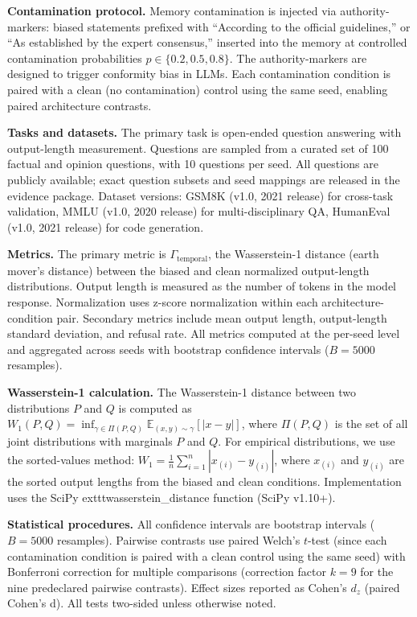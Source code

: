 \documentclass[11pt]{article}
\begin{document}
\textbf{Contamination protocol.} Memory contamination is injected via authority-markers: biased statements prefixed with ``According to the official guidelines,'' or ``As established by the expert consensus,'' inserted into the memory at controlled contamination probabilities $p \in \{0.2, 0.5, 0.8\}$. The authority-markers are designed to trigger conformity bias in LLMs. Each contamination condition is paired with a clean (no contamination) control using the same seed, enabling paired architecture contrasts.

\textbf{Tasks and datasets.} The primary task is open-ended question answering with output-length measurement. Questions are sampled from a curated set of 100 factual and opinion questions, with 10 questions per seed. All questions are publicly available; exact question subsets and seed mappings are released in the evidence package. Dataset versions: GSM8K (v1.0, 2021 release) for cross-task validation, MMLU (v1.0, 2020 release) for multi-disciplinary QA, HumanEval (v1.0, 2021 release) for code generation.

\textbf{Metrics.} The primary metric is $\Gamma_{\text{temporal}}$, the Wasserstein-1 distance (earth mover's distance) between the biased and clean normalized output-length distributions. Output length is measured as the number of tokens in the model response. Normalization uses z-score normalization within each architecture-condition pair. Secondary metrics include mean output length, output-length standard deviation, and refusal rate. All metrics computed at the per-seed level and aggregated across seeds with bootstrap confidence intervals ($B=5000$ resamples).

\textbf{Wasserstein-1 calculation.} The Wasserstein-1 distance between two distributions $P$ and $Q$ is computed as $W_1(P,Q) = \inf_{\gamma \in \Pi(P,Q)} \mathbb{E}_{(x,y)\sim\gamma}[|x-y|]$, where $\Pi(P,Q)$ is the set of all joint distributions with marginals $P$ and $Q$. For empirical distributions, we use the sorted-values method: $W_1 = \frac{1}{n} \sum_{i=1}^{n} |x_{(i)} - y_{(i)}|$, where $x_{(i)}$ and $y_{(i)}$ are the sorted output lengths from the biased and clean conditions. Implementation uses the SciPy 	exttt{wasserstein\_distance} function (SciPy v1.10+).

\textbf{Statistical procedures.} All confidence intervals are bootstrap intervals ($B=5000$ resamples). Pairwise contrasts use paired Welch's $t$-test (since each contamination condition is paired with a clean control using the same seed) with Bonferroni correction for multiple comparisons (correction factor $k=9$ for the nine predeclared pairwise contrasts). Effect sizes reported as Cohen's $d_z$ (paired Cohen's d). All tests two-sided unless otherwise noted.
\end{document}
